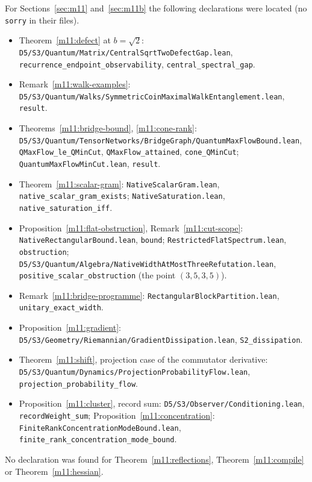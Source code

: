 \documentclass[11pt,reqno]{amsart}
\theoremstyle{definition}
\theoremstyle{remark}
\numberwithin{equation}{section}
\begin{document}
For Sections~\ref{sec:m11} and~\ref{sec:m11b} the following declarations were located (no \texttt{sorry} in their files).
{\small\raggedright
\begin{itemize}[leftmargin=1.5em]
\item Theorem~\ref{m11:defect} at $b=\sqrt2$: \texttt{D5/S3/Quantum/Matrix/CentralSqrtTwoDefectGap.lean}, \texttt{recurrence\_endpoint\_observability},
\texttt{central\_spectral\_gap}.
\item Remark~\ref{m11:walk-examples}: \texttt{D5/S3/Quantum/Walks/SymmetricCoinMaximalWalkEntanglement.lean}, \texttt{result}.
\item Theorems~\ref{m11:bridge-bound}, \ref{m11:cone-rank}: \texttt{D5/S3/Quantum/TensorNetworks/BridgeGraph/QuantumMaxFlowBound.lean},
\texttt{QMaxFlow\_le\_QMinCut}, \texttt{QMaxFlow\_attained}, \texttt{cone\_QMinCut}; \texttt{QuantumMaxFlowMinCut.lean}, \texttt{result}.
\item Theorem~\ref{m11:scalar-gram}: \texttt{NativeScalarGram.lean}, \texttt{native\_scalar\_gram\_exists}; \texttt{NativeSaturation.lean},
\texttt{native\_saturation\_iff}.
\item Proposition~\ref{m11:flat-obstruction}, Remark~\ref{m11:cut-scope}: \texttt{NativeRectangularBound.lean}, \texttt{bound};
\texttt{RestrictedFlatSpectrum.lean}, \texttt{obstruction}; \texttt{D5/S3/Quantum/Algebra/NativeWidthAtMostThreeRefutation.lean},
\texttt{positive\_scalar\_obstruction} (the point $(3,5,3,5)$).
\item Remark~\ref{m11:bridge-programme}: \texttt{RectangularBlockPartition.lean}, \texttt{unitary\_exact\_width}.
\item Proposition~\ref{m11:gradient}: \texttt{D5/S3/Geometry/Riemannian/GradientDissipation.lean}, \texttt{S2\_dissipation}.
\item Theorem~\ref{m11:shift}, projection case of the commutator derivative: \texttt{D5/S3/Quantum/Dynamics/ProjectionProbabilityFlow.lean},
\texttt{projection\_probability\_flow}.
\item Proposition~\ref{m11:cluster}, record sum: \texttt{D5/S3/Observer/Conditioning.lean}, \texttt{recordWeight\_sum};
Proposition~\ref{m11:concentration}: \texttt{FiniteRankConcentrationModeBound.lean}, \texttt{finite\_rank\_concentration\_mode\_bound}.
\end{itemize}}
No declaration was found for Theorem~\ref{m11:reflections}, Theorem~\ref{m11:compile} or Theorem~\ref{m11:hessian}.
\end{document}
